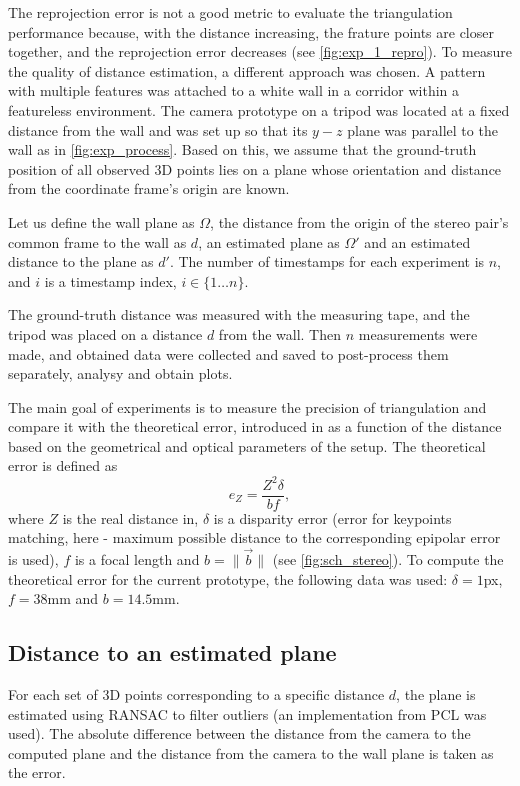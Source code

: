 The reprojection error is not a good metric to evaluate the triangulation performance because, with the distance increasing, the frature points are closer together, and the reprojection error decreases (see \autoref{fig:exp_1_repro}).
To measure the quality of distance estimation, a different approach was chosen.
A pattern with multiple features was attached to a white wall in a corridor within a featureless environment.
The camera prototype on a tripod was located at a fixed distance from the wall and was set up so that its $y-z$ plane was parallel to the wall as in \autoref{fig:exp_process}.
Based on this, we assume that the ground-truth position of all observed 3D points lies on a plane whose orientation and distance from the coordinate frame's origin are known.

Let us define the wall plane as $\Omega$, the distance from the origin of the stereo pair's common frame to the wall as $d$, an estimated plane as $\Omega'$ and an estimated distance to the plane as $d'$.
The number of timestamps for each experiment is $n$, and $i$ is a timestamp index, $i \in \{1 \dots n\}$.

The ground-truth distance was measured with the measuring tape, and the tripod was placed on a distance $d$ from the wall. 
Then $n$ measurements were made, and obtained data were collected and saved to post-process them separately, analysy and obtain plots.

The main goal of experiments is to measure the precision of triangulation and compare it with the theoretical error, introduced in \cite{cv_theoretical_error} as a function of the distance based on the geometrical and optical parameters of the setup.
The theoretical error is defined as
\begin{equation}
    e_Z = \frac{Z^2 \delta}{bf},
\end{equation}
where $Z$ is the real distance in, $\delta$ is a disparity error (error for keypoints matching, here - maximum possible distance to the corresponding epipolar error is used), $f$ is a focal length and $b = \lVert \vec{b} \rVert$ (see \autoref{fig:sch_stereo}).
To compute the theoretical error for the current prototype, the following data was used: $\delta=1$px, $f=38$mm and $b=14.5$mm.

\subsection{Distance to an estimated plane}
\label{sec:exp1}
For each set of 3D points corresponding to a specific distance $d$, the plane is estimated using RANSAC to filter outliers (an implementation from PCL was used).
The absolute difference between the distance from the camera to the computed plane and the distance from the camera to the wall plane is taken as the error.

